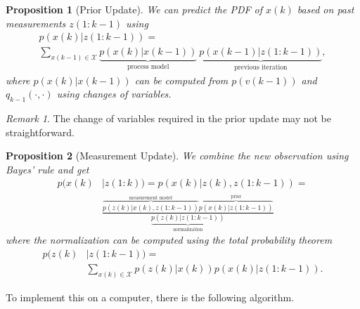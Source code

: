 \documentclass[margin=small]{hsrzf}
\theoremstyle{plain}
\newtheorem{prop}{Proposition}[section]
\theoremstyle{definition}
\theoremstyle{remark}
\newtheorem*{remark}{Remark}
\begin{document}
\begin{prop}[Prior Update]
  We can predict the PDF of $x(k)$ based on past measurements $z(1:k-1)$ using
  \begin{gather*}
    p(x(k)|z(1:k-1)) = \\
      \sum_{x(k-1) \in \mathcal{X}}
      \underbrace{p(x(k) | x(k-1))}_{\text{process model}} ~
      \underbrace{p(x(k-1) | z(1:k-1))}_{\text{previous iteration}},
  \end{gather*}
  where $p(x(k) | x(k-1))$ can be computed from $p(v(k-1))$ and
  $q_{k-1}(\cdot, \cdot)$ using changes of variables.
\end{prop}

\begin{remark}
  The change of variables required in the prior update may not be
  straightforward.
\end{remark}

\begin{prop}[Measurement Update]
  We combine the new observation using Bayes' rule and get
  \begin{align*}
    p(x(k) &| z(1:k)) = p(x(k) | z(k), z(1:k-1)) = \\
      &\frac{
        \overbrace{p(z(k) | x(k), z(1:k-1))}^{\text{measurement model}}
        \overbrace{p(x(k) | z(1:k-1))}^{\text{prior}}
      }{\underbrace{p(z(k) | z(1:k-1))}_\text{normalization}}
  \end{align*}
  where the normalization can be computed using the total probability theorem
  \begin{align*}
    p(z(k) &| z(1:k-1)) =  \\
      &\sum_{x(k) \in \mathcal{X}} p(z(k) | x(k)) p(x(k) | z(1: k-1)).
  \end{align*}
\end{prop}

To implement this on a computer, there is the following algorithm.
\end{document}
